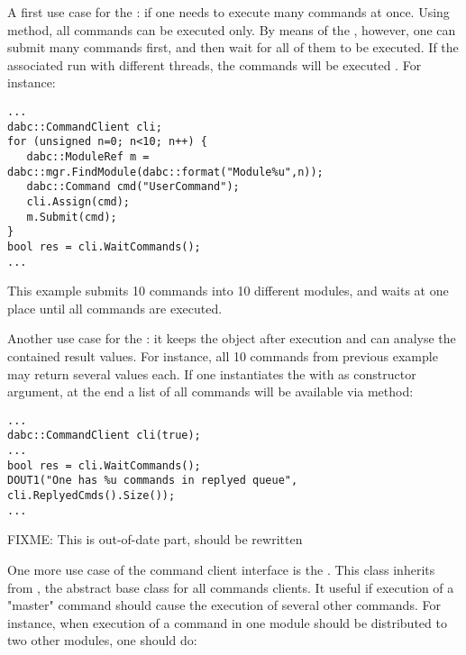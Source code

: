 A first use case for the : if one needs to execute many commands at once.
Using  method, all commands can be  executed  only.
By means of the , however, 
one can  submit many commands first, and then wait for all
of them to be executed.  If the associated  run with 
different threads, the commands will be executed . For instance:

\begin{small}
\begin{verbatim}
...
dabc::CommandClient cli;
for (unsigned n=0; n<10; n++) {
   dabc::ModuleRef m = dabc::mgr.FindModule(dabc::format("Module%u",n));
   dabc::Command cmd("UserCommand");
   cli.Assign(cmd);
   m.Submit(cmd);
}
bool res = cli.WaitCommands();
...
\end{verbatim}     
\end{small}
  
This example submits 10 commands into 10 different modules, 
and waits at one place until all commands are executed.

Another use case for the : 
it keeps the  object after execution 
and can analyse the contained result values. 
For instance, all 10 commands from previous example may 
return several values each. If one instantiates 
the  with  as constructor argument,
at the end a list of all commands will be available 
via  method: 
\begin{small}
\begin{verbatim}
...
dabc::CommandClient cli(true);
...
bool res = cli.WaitCommands();
DOUT1("One has %u commands in replyed queue", cli.ReplyedCmds().Size());
...
\end{verbatim}     
\end{small}


FIXME: This is out-of-date part, should be rewritten

One more use case of the command client interface is the . 
This class inherits from ,
the abstract base class for all commands clients. 
It useful if execution of a "master" command should cause the execution of several
other commands. For instance, when execution of a command 
in one module should be distributed to two other modules, one should do:

